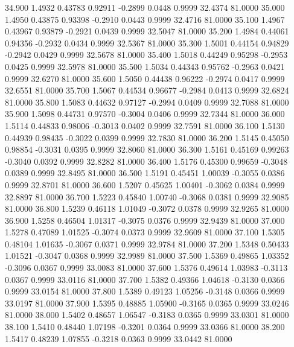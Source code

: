   34.900   1.4932   0.43783   0.92911  -0.2899   0.0448   0.9999  32.4374  81.0000
  35.000   1.4950   0.43875   0.93398  -0.2910   0.0443   0.9999  32.4716  81.0000
  35.100   1.4967   0.43967   0.93879  -0.2921   0.0439   0.9999  32.5047  81.0000
  35.200   1.4984   0.44061   0.94356  -0.2932   0.0434   0.9999  32.5367  81.0000
  35.300   1.5001   0.44154   0.94829  -0.2942   0.0429   0.9999  32.5678  81.0000
  35.400   1.5018   0.44249   0.95298  -0.2953   0.0425   0.9999  32.5978  81.0000
  35.500   1.5034   0.44343   0.95762  -0.2963   0.0421   0.9999  32.6270  81.0000
  35.600   1.5050   0.44438   0.96222  -0.2974   0.0417   0.9999  32.6551  81.0000
  35.700   1.5067   0.44534   0.96677  -0.2984   0.0413   0.9999  32.6824  81.0000
  35.800   1.5083   0.44632   0.97127  -0.2994   0.0409   0.9999  32.7088  81.0000
  35.900   1.5098   0.44731   0.97570  -0.3004   0.0406   0.9999  32.7344  81.0000
  36.000   1.5114   0.44833   0.98006  -0.3013   0.0402   0.9999  32.7591  81.0000
  36.100   1.5130   0.44939   0.98435  -0.3022   0.0399   0.9999  32.7830  81.0000
  36.200   1.5145   0.45050   0.98854  -0.3031   0.0395   0.9999  32.8060  81.0000
  36.300   1.5161   0.45169   0.99263  -0.3040   0.0392   0.9999  32.8282  81.0000
  36.400   1.5176   0.45300   0.99659  -0.3048   0.0389   0.9999  32.8495  81.0000
  36.500   1.5191   0.45451   1.00039  -0.3055   0.0386   0.9999  32.8701  81.0000
  36.600   1.5207   0.45625   1.00401  -0.3062   0.0384   0.9999  32.8897  81.0000
  36.700   1.5223   0.45840   1.00740  -0.3068   0.0381   0.9999  32.9085  81.0000
  36.800   1.5239   0.46118   1.01049  -0.3072   0.0378   0.9999  32.9265  81.0000
  36.900   1.5258   0.46504   1.01317  -0.3075   0.0376   0.9999  32.9439  81.0000
  37.000   1.5278   0.47089   1.01525  -0.3074   0.0373   0.9999  32.9609  81.0000
  37.100   1.5305   0.48104   1.01635  -0.3067   0.0371   0.9999  32.9784  81.0000
  37.200   1.5348   0.50433   1.01521  -0.3047   0.0368   0.9999  32.9989  81.0000
  37.500   1.5369   0.49865   1.03352  -0.3096   0.0367   0.9999  33.0083  81.0000
  37.600   1.5376   0.49614   1.03983  -0.3113   0.0367   0.9999  33.0116  81.0000
  37.700   1.5382   0.49366   1.04618  -0.3130   0.0366   0.9999  33.0154  81.0000
  37.800   1.5389   0.49123   1.05256  -0.3148   0.0366   0.9999  33.0197  81.0000
  37.900   1.5395   0.48885   1.05900  -0.3165   0.0365   0.9999  33.0246  81.0000
  38.000   1.5402   0.48657   1.06547  -0.3183   0.0365   0.9999  33.0301  81.0000
  38.100   1.5410   0.48440   1.07198  -0.3201   0.0364   0.9999  33.0366  81.0000
  38.200   1.5417   0.48239   1.07855  -0.3218   0.0363   0.9999  33.0442  81.0000
